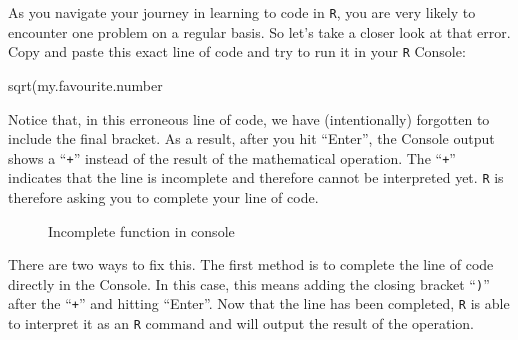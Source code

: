 \documentclass[
  letterpaper,
  DIV=11,
  numbers=noendperiod,
  oneside]{scrreprt}
\newenvironment{Shaded}{\begin{snugshade}}{\end{snugshade}}
\newcommand{\FunctionTok}[1]{\textcolor[rgb]{0.28,0.35,0.67}{#1}}
\newcommand{\NormalTok}[1]{\textcolor[rgb]{0.00,0.23,0.31}{#1}}
\begin{document}
As you navigate your journey in learning to code in \texttt{R}, you are
very likely to encounter one problem on a regular basis. So let's take a
closer look at that error. Copy and paste this exact line of code and
try to run it in your \texttt{R} Console:

\begin{Shaded}
\begin{Highlighting}[]
\FunctionTok{sqrt}\NormalTok{(my.favourite.number}
\end{Highlighting}
\end{Shaded}

Notice that, in this erroneous line of code, we have (intentionally)
forgotten to include the final bracket. As a result, after you hit
``Enter'', the Console output shows a ``\texttt{+}'' instead of the
result of the mathematical operation. The ``\texttt{+}'' indicates that
the line is incomplete and therefore cannot be interpreted yet.
\texttt{R} is therefore asking you to complete your line of code.

\begin{figure}


\caption{\label{fig-ConsoleUncompleteFunction}Incomplete function in
console}

\end{figure}%

There are two ways to fix this. The first method is to complete the line
of code directly in the Console. In this case, this means adding the
closing bracket ``\texttt{)}'' after the ``\texttt{+}'' and hitting
``Enter''. Now that the line has been completed, \texttt{R} is able to
interpret it as an \texttt{R} command and will output the result of the
operation.
\end{document}
